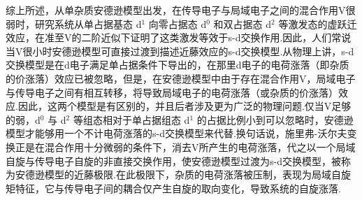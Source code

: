 综上所述，从单杂质安德逊模型出发，在传导电子与局域电子之间的混合作用V很弱时，研究系统从单占据基态 d$^{1}$ 向零占据态 d$^{0}$ 和双占据态 d$^{2}$ 等激发态的虚跃迁效应，在准至V的二阶近似下证明了这类激发等效于s-d交换作用.因此，人们常说当V很小时安德逊模型可直接过渡到描述近藤效应的s-d交换模型.从物理上讲，s-d交换模型是在d电子满足单占据条件下导出的，在那里d电子的电荷涨落（即杂质的价涨落）效应已被忽略，但是，在安德逊模型中由于存在混合作用V，局域电子与传导电子之间有相互转移，将导致局域电子的电荷涨落（或杂质的价涨落）效应.因此，这两个模型是有区别的，并且后者涉及更为广泛的物理问题.仅当V足够的弱，d$^{0}$ 与 d$^{2}$ 等组态相对于单占据组态 d$^{1}$ 的占据比例小到可以忽略时，安德逊模型才能够用一个不计电荷涨落的s-d交换模型来代替.换句话说，施里弗-沃尔夫变换正是在混合作用十分微弱的条件下，消去V所产生的电荷涨落，代之以一个局域自旋与传导电子自旋的非直接交换作用，使安德逊模型过渡为s-d交换模型，被称为安德逊模型的近藤极限.在此极限下，杂质的电荷涨落被压制，表现为局域自旋矩特征，它与传导电子间的耦合仅产生自旋的取向变化，导致系统的自旋涨落.

